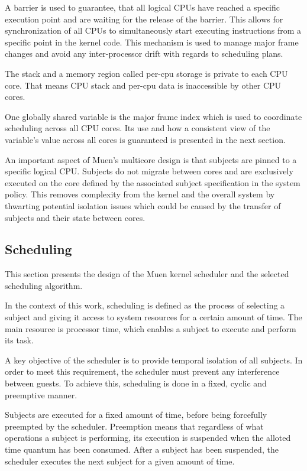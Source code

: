 A barrier is used to guarantee, that all logical CPUs have reached a specific
execution point and are waiting for the release of the barrier. This allows for
synchronization of all CPUs to simultaneously start executing instructions from
a specific point in the kernel code. This mechanism is used to manage major
frame changes and avoid any inter-processor drift with regards to scheduling
plans.

The stack and a memory region called per-cpu storage is private to each CPU
core. That means CPU stack and per-cpu data is inaccessible by other CPU cores.

One globally shared variable is the major frame index which is used to
coordinate scheduling across all CPU cores. Its use and how a consistent view of
the variable's value across all cores is guaranteed is presented in the next
section.

An important aspect of Muen's multicore design is that subjects are pinned to a
specific logical CPU. Subjects do not migrate between cores and are exclusively
executed on the core defined by the associated subject specification in the
system policy. This removes complexity from the kernel and the overall system by
thwarting potential isolation issues which could be caused by the transfer of
subjects and their state between cores.

\subsection{Scheduling}\label{subsec:design-scheduling}
This section presents the design of the Muen kernel scheduler and the selected
scheduling algorithm.

In the context of this work, scheduling is defined as the process of selecting
a subject and giving it access to system resources for a certain amount of time.
The main resource is processor time, which enables a subject to execute and
perform its task.

A key objective of the scheduler is to provide temporal isolation of all
subjects. In order to meet this requirement, the scheduler must prevent any
interference between guests. To achieve this, scheduling is done in a fixed,
cyclic and preemptive manner.

Subjects are executed for a fixed amount of time, before being forcefully
preempted by the scheduler. Preemption means that regardless of what operations
a subject is performing, its execution is suspended when the alloted time
quantum has been consumed. After a subject has been suspended, the scheduler
executes the next subject for a given amount of time.

